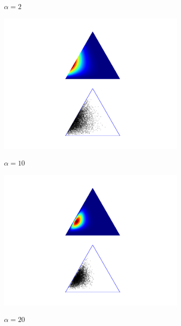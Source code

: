 \documentclass[12pt]{beamer}
\begin{document}
\begin{frame}[t]
\begin{figure}[!h]
\begin{subfigure}[t]{0.32\textwidth}
            $\alpha = 2$
        \end{subfigure}
        \begin{subfigure}[t]{0.32\textwidth}
            \centering
            \includegraphics[width=\textwidth]{images/example_dirichlet_alpha_10.png}

            $\alpha = 10$
        \end{subfigure}
        \begin{subfigure}[t]{0.32\textwidth}
            \centering
            \includegraphics[width=\textwidth]{images/example_dirichlet_alpha_20.png}

            $\alpha = 20$
        \end{subfigure}
    \end{figure}

\end{frame}
\end{document}
